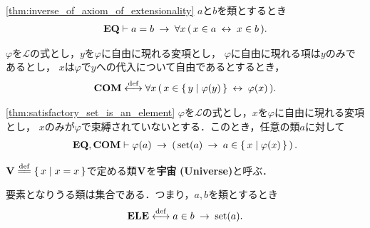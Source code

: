 	\begin{screen}
		\begin{thm}[外延性の公理の逆も成り立つ]
		\ref{thm:inverse_of_axiom_of_extensionality}
			$a$と$b$を類とするとき
			\begin{align}
				\mbox{{\bf EQ}} \vdash 
				a = b \hspace{0.25em}\rightarrow\hspace{0.25em} \forall x\, (\, x \in a  \hspace{0.25em}\leftrightarrow\hspace{0.25em} x \in b\, ).
			\end{align}
		\end{thm}
	\end{screen}
	
	\begin{screen}
		\begin{axm}[内包性公理] 
			$\varphi$を$\mathcal{L}$の式とし，$y$を$\varphi$に自由に現れる変項とし，
			$\varphi$に自由に現れる項は$y$のみであるとし，
			$x$は$\varphi$で$y$への代入について自由であるとするとき，
			\begin{align}
				\mbox{\bf COM} \overset{\mathrm{def}}{\longleftrightarrow} \forall x\, (\, x \in \left\{\, y \mid \varphi(y)\, \right\} \hspace{0.25em}\leftrightarrow\hspace{0.25em} \varphi(x)\, ).
			\end{align}
		\end{axm}
	\end{screen}
	
	\begin{screen}
		\begin{thm}[条件を満たす集合は要素である]\ref{thm:satisfactory_set_is_an_element}
			$\varphi$を$\mathcal{L}$の式とし，$x$を$\varphi$に自由に現れる変項とし，
			$x$のみが$\varphi$で束縛されていないとする．このとき，任意の類$a$に対して
			\begin{align}
				\mbox{{\bf EQ}},\mbox{\bf COM} \vdash \varphi(a) \hspace{0.25em}\rightarrow\hspace{0.25em} 
				\left(\, \operatorname*{set} (a) \hspace{0.25em}\rightarrow\hspace{0.25em} a \in \left\{\, x \mid \varphi(x)\, \right\}\, \right).
			\end{align}
		\end{thm}
	\end{screen}
	
	\begin{screen}
		\begin{dfn}[宇宙]
			$\Univ \defeq \Set{x}{x=x}$で定める類$\mathbf{V}$を{\bf 宇宙}\index{うちゅう@宇宙}
			{\bf (Universe)}と呼ぶ．
		\end{dfn}
	\end{screen}
	
	\begin{screen}
		\begin{axm}[要素の公理]
			要素となりうる類は集合である．つまり，$a,b$を類とするとき
			\begin{align}
				\mbox{{\bf ELE}} \overset{\mathrm{def}}{\longleftrightarrow} a \in b \hspace{0.25em}\rightarrow\hspace{0.25em} \operatorname*{set} (a).
			\end{align}
		\end{axm}
	\end{screen}
	

